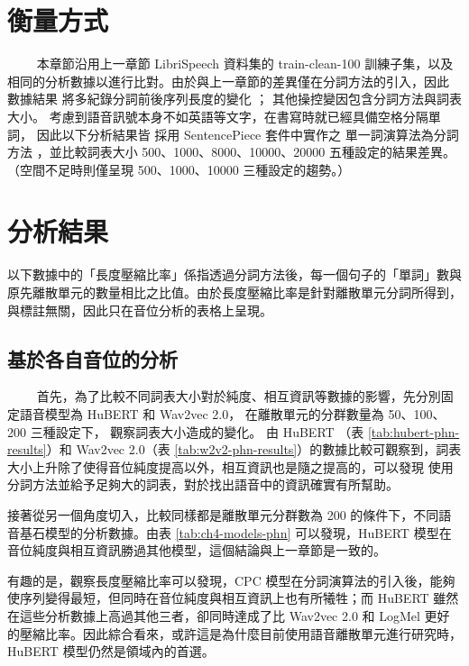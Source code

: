 
\section{衡量方式}
　　
本章節沿用上一章節 LibriSpeech 資料集的 train-clean-100 訓練子集，以及相同的分析數據以進行比對。由於與上一章節的差異僅在分詞方法的引入，因此
數據結果
將多紀錄分詞前後序列長度的變化
；
其他操控變因包含分詞方法與詞表大小。
考慮到語音訊號本身不如英語等文字，在書寫時就已經具備空格分隔單詞，
因此以下分析結果皆
採用 SentencePiece 套件中實作之
單一詞演算法為分詞方法
，並比較詞表大小 500、1000、8000、10000、20000 五種設定的結果差異。（空間不足時則僅呈現 500、1000、10000 三種設定的趨勢。）

\section{分析結果}

以下數據中的「長度壓縮比率」係指透過分詞方法後，每一個句子的「單詞」數與原先離散單元的數量相比之比值。由於長度壓縮比率是針對離散單元分詞所得到，與標註無關，因此只在音位分析的表格上呈現。

\subsection{基於各自音位的分析}
　　
首先，為了比較不同詞表大小對於純度、相互資訊等數據的影響，先分別固定語音模型為 HuBERT 和 Wav2vec 2.0，
在離散單元的分群數量為 50、100、200 三種設定下，
觀察詞表大小造成的變化。
由 HuBERT （表 \ref{tab:hubert-phn-results}）和 Wav2vec 2.0（表 \ref{tab:w2v2-phn-results}）的數據比較可觀察到，詞表大小上升除了使得音位純度提高以外，相互資訊也是隨之提高的，可以發現
使用分詞方法並給予足夠大的詞表，對於找出語音中的資訊確實有所幫助。

接著從另一個角度切入，比較同樣都是離散單元分群數為 200 的條件下，不同語音基石模型的分析數據。由表 \ref{tab:ch4-models-phn} 可以發現，HuBERT 模型在音位純度與相互資訊勝過其他模型，這個結論與上一章節是一致的。

有趣的是，觀察長度壓縮比率可以發現，CPC 模型在分詞演算法的引入後，能夠使序列變得最短，但同時在音位純度與相互資訊上也有所犧牲；而 HuBERT 雖然在這些分析數據上高過其他三者，卻同時達成了比 Wav2vec 2.0 和 LogMel 更好的壓縮比率。因此綜合看來，或許這是為什麼目前使用語音離散單元進行研究時，HuBERT 模型仍然是領域內的首選。


